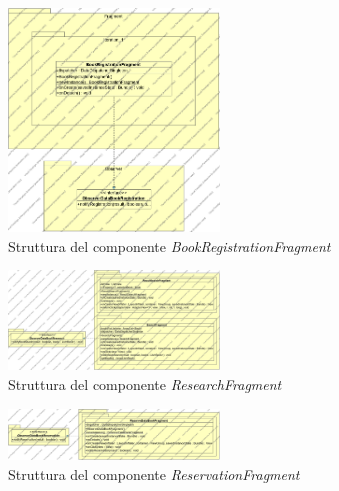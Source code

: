 \begin{figure}[h!]
	\includegraphics[width=0.5\textwidth]{Immagini/BookRegistrationFragment}
	\caption{Struttura del componente \textit{BookRegistrationFragment}}
	\label{fig:BookRegistrationFragment}
\end{figure}

\begin{figure} [h!]
	\includegraphics[width=0.5\textwidth]{Immagini/ResearchFragment.jpg}
	\caption{Struttura del componente \textit{ResearchFragment}}
	\label{fig:ResearchFragment}
\end{figure}

\begin{figure} [h!]
	\includegraphics[width=0.5\textwidth]{Immagini/ReservationFragment.jpg}
	\caption{Struttura del componente \textit{ReservationFragment}}
	\label{fig:ReservationFragment}
\end{figure}